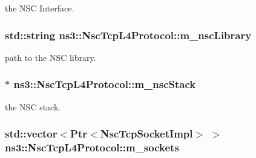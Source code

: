 the N\+SC Interface. 

\subsubsection[{\texorpdfstring{m\+\_\+nsc\+Library}{m_nscLibrary}}]{\setlength{\rightskip}{0pt plus 5cm}std\+::string ns3\+::\+Nsc\+Tcp\+L4\+Protocol\+::m\+\_\+nsc\+Library\hspace{0.3cm}{\ttfamily [private]}}\hypertarget{classns3_1_1NscTcpL4Protocol_a2ccb18257227f0616ebaaf553cea7fb7}{}\label{classns3_1_1NscTcpL4Protocol_a2ccb18257227f0616ebaaf553cea7fb7}


path to the N\+SC library. 

\subsubsection[{\texorpdfstring{m\+\_\+nsc\+Stack}{m_nscStack}}]{$\ast$ ns3\+::\+Nsc\+Tcp\+L4\+Protocol\+::m\+\_\+nsc\+Stack\hspace{0.3cm}{\ttfamily [private]}}\hypertarget{classns3_1_1NscTcpL4Protocol_abf40617904f5f2e4424ab79545efb04f}{}\label{classns3_1_1NscTcpL4Protocol_abf40617904f5f2e4424ab79545efb04f}


the N\+SC stack. 

\subsubsection[{\texorpdfstring{m\+\_\+sockets}{m_sockets}}]{\setlength{\rightskip}{0pt plus 5cm}std\+::vector$<${\bf Ptr}$<${\bf Nsc\+Tcp\+Socket\+Impl}$>$ $>$ ns3\+::\+Nsc\+Tcp\+L4\+Protocol\+::m\+\_\+sockets\hspace{0.3cm}{\ttfamily [private]}}\hypertarget{classns3_1_1NscTcpL4Protocol_ab8a0e5f53dffd3991f97dc7f886c0dc8}{}\label{classns3_1_1NscTcpL4Protocol_ab8a0e5f53dffd3991f97dc7f886c0dc8}


